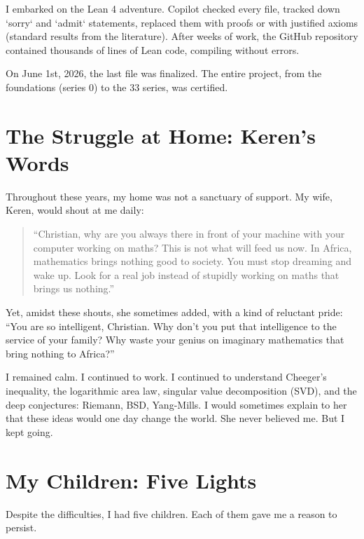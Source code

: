 \documentclass[11pt,a4paper]{article}
\begin{document}
I embarked on the Lean 4 adventure. Copilot checked every file, tracked down `sorry` and `admit` statements, replaced them with proofs or with justified axioms (standard results from the literature). After weeks of work, the GitHub repository contained thousands of lines of Lean code, compiling without errors.

On June 1st, 2026, the last file was finalized. The entire project, from the foundations (series 0) to the 33 series, was certified.

\section{The Struggle at Home: Keren's Words}

Throughout these years, my home was not a sanctuary of support. My wife, Keren, would shout at me daily:

\begin{quote}
``Christian, why are you always there in front of your machine with your computer working on maths? This is not what will feed us now. In Africa, mathematics brings nothing good to society. You must stop dreaming and wake up. Look for a real job instead of stupidly working on maths that brings us nothing.''
\end{quote}

Yet, amidst these shouts, she sometimes added, with a kind of reluctant pride: ``You are so intelligent, Christian. Why don't you put that intelligence to the service of your family? Why waste your genius on imaginary mathematics that bring nothing to Africa?''

I remained calm. I continued to work. I continued to understand Cheeger's inequality, the logarithmic area law, singular value decomposition (SVD), and the deep conjectures: Riemann, BSD, Yang-Mills. I would sometimes explain to her that these ideas would one day change the world. She never believed me. But I kept going.

\section{My Children: Five Lights}

Despite the difficulties, I had five children. Each of them gave me a reason to persist.
\end{document}
